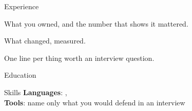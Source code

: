 \documentclass[fontset=commercial,pagefooter=false]{yuan2resume}
\begin{document}
\maketitle

\begin{cvtwocolumn}

\begin{cvsection}{Experience}
  \begin{cvitemize}
    \item What you owned, and the number that shows it mattered.
  \end{cvitemize}
  \begin{cventry}
    \begin{cvitemize}
      \item What changed, measured.
    \end{cvitemize}
  \end{cventry}

  \cvgap  %

  \begin{cvitemize}
    \item One line per thing worth an interview question.
  \end{cvitemize}
\end{cvsection}

\begin{cvsection}{Education}
\end{cvsection}

\begin{cvsection}{Skills}
  \textbf{Languages}: {}, {} \\
  \textbf{Tools}: name only what you would defend in an interview
\end{cvsection}

\end{cvtwocolumn}
\end{document}
